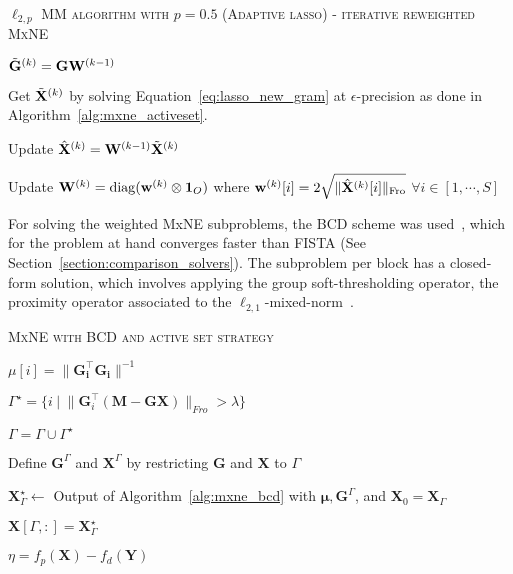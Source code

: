 {\fontsize{4}{4}\selectfont
\begin{algorithm}[t]
\caption{\textsc{$\ell_{2,p}$ MM algorithm with $p=0.5$ (Adaptive \ac{lasso}) - iterative reweighted MxNE}}
    {
		$\tilde{\mathbf{G}}^{(k)} = \mathbf{G} \mathbf{W}^{(k-1)}$

		Get $\tilde{\mathbf{X}}^{(k)}$ by solving Equation~\eqref{eq:lasso_new_gram} at $\epsilon$-precision as done in Algorithm~\ref{alg:mxne_activeset}.

		Update $\hat{\mathbf{X}}^{(k)} = \mathbf{W}^{(k-1)} \tilde{\mathbf{X}}^{(k)}$

	    Update $\mathbf{W}^{(k)}=\mathrm{diag}(\mathbf{w}^{(k)} \otimes \mathbf{1}_{O})$ where $\mathbf{w}^{(k)}[i] = 2 \sqrt{\|{\hat{\mathbf{X}}^{(k)}[i]}\|_{\rm Fro}}$  $\forall i\in [1, \cdots, S]$


     }
\label{alg:adpative_lasso}
\end{algorithm}
}

For solving the weighted MxNE subproblems, the \ac{BCD} scheme was used~\cite{tseng}, which for the problem at hand converges faster than \ac{FISTA} (See Section~\ref{section:comparison_solvers}). The subproblem per block has a closed-form solution, which involves applying the group soft-thresholding operator, the proximity operator associated to the $\ell_{2,1}$-mixed-norm~\cite{gramfort2012mixed,strohmeier-etal:16}.

{\fontsize{4}{4}\selectfont
\begin{algorithm}[t]
\caption{\textsc{MxNE with BCD and active set strategy}}
    {
		$\mu[i] = \|\mathbf{G^\top_i\mathbf{G}_i}\|^{-1}$
     }
\While{
		$\eta \geq \epsilon$
	  }
	  {
	  	$\Gamma^\star = \{i \hspace{3pt} | \hspace{3pt} \|\mathbf{G}_i^\top(\mathbf{M}-\mathbf{GX})\|_{Fro} > \lambda\}$

	  	$\Gamma = \Gamma\cup \Gamma^\star$

	  	Define $\mathbf{G}^\Gamma$ and $\mathbf{X}^\Gamma$ by restricting $\mathbf{G}$ and $\mathbf{X}$ to $\Gamma$

	  	$\mathbf{X}^{\star}_\Gamma \leftarrow$ Output of Algorithm~\ref{alg:mxne_bcd} with $\mathbf{\mu}, \mathbf{G}^\Gamma$, and $\mathbf{X}_0=\mathbf{X}_\Gamma$

	  	$\mathbf{X}[\Gamma, :] = \mathbf{X}^{\star}_\Gamma$

	  	$\eta=f_p(\mathbf{X})-f_d(\mathbf{Y})$
	  }
\label{alg:mxne_activeset}
\end{algorithm}
}

